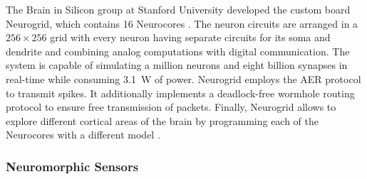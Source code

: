 The Brain in Silicon group at Stanford University developed the custom board Neurogrid, which contains \num{16} Neurocores \cite{Benjamin2014, Choudhary2012}.
The neuron circuits are arranged in a $256\times256$ grid with every neuron having separate circuits for its soma and  dendrite and combining analog computations with digital communication.
The system is capable of simulating a million neurons and eight billion synapses in real-time while consuming \SI{3.1}{\watt} of power.
Neurogrid employs the \ac{AER} protocol to transmit spikes.
It additionally implements a deadlock-free wormhole routing protocol to ensure free transmission of packets.
Finally, Neurogrid allows to explore different cortical areas of the brain by programming each of the Neurocores with a different model \cite{Merolla2014}.

\subsubsection{Neuromorphic Sensors}
\label{subsubsec:neuro_sensors}

